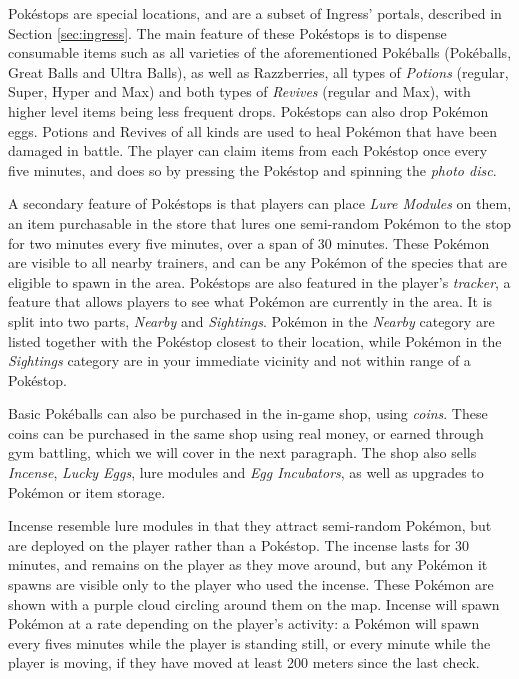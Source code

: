 Pokéstops are special locations, and are a subset of Ingress' portals, described in Section \ref{sec:ingress}. The main feature of these Pokéstops is to dispense consumable items such as all varieties of the aforementioned Pokéballs (Pokéballs, Great Balls and Ultra Balls), as well as Razzberries, all types of \emph{Potions} (regular, Super, Hyper and Max) and both types of \emph{Revives} (regular and Max), with higher level items being less frequent drops. Pokéstops can also drop Pokémon eggs. Potions and Revives of all kinds are used to heal Pokémon that have been damaged in battle. The player can claim items from each Pokéstop once every five minutes, and does so by pressing the Pokéstop and spinning the \emph{photo disc}.

A secondary feature of Pokéstops is that players can place \emph{Lure Modules} on them, an item purchasable in the store that lures one semi-random Pokémon to the stop for two minutes every five minutes, over a span of 30 minutes. These Pokémon are visible to all nearby trainers, and can be any Pokémon of the species that are eligible to spawn in the area. Pokéstops are also featured in the player's \emph{tracker}, a feature that allows players to see what Pokémon are currently in the area. It is split into two parts, \emph{Nearby} and \emph{Sightings}. Pokémon in the \emph{Nearby} category are listed together with the Pokéstop closest to their location, while Pokémon in the \emph{Sightings} category are in your immediate vicinity and not within range of a Pokéstop.

Basic Pokéballs can also be purchased in the in-game shop, using \emph{coins}. These coins can be purchased in the same shop using real money, or earned through gym battling, which we will cover in the next paragraph. The shop also sells \emph{Incense}, \emph{Lucky Eggs}, lure modules and \emph{Egg Incubators}, as well as upgrades to Pokémon or item storage.

Incense resemble lure modules in that they attract semi-random Pokémon, but are deployed on the player rather than a Pokéstop. The incense lasts for 30 minutes, and remains on the player as they move around, but any Pokémon it spawns are visible only to the player who used the incense. These Pokémon are shown with a purple cloud circling around them on the map. Incense will spawn Pokémon at a rate depending on the player's activity: a Pokémon will spawn every fives minutes while the player is standing still, or every minute while the player is moving, if they have moved at least 200 meters since the last check.


